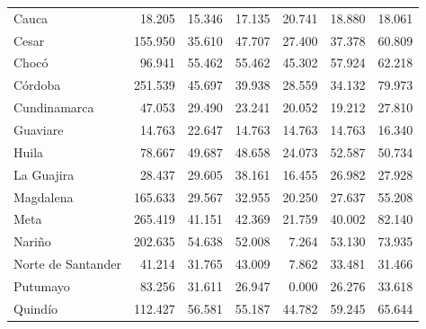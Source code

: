 \documentclass[11pt,a4paper,oneside]{article}
\begin{document}
\begin{table}
\begin{tabular}{lrrrrrr}
Cauca              & 18.205     & 15.346                             & 17.135                     & 20.741                             & 18.880 & 18.061 \\
Cesar              & 155.950    & 35.610                             & 47.707                     & 27.400                             & 37.378 & 60.809 \\
Chocó              & 96.941     & 55.462                             & 55.462                     & 45.302                             & 57.924 & 62.218 \\
Córdoba            & 251.539    & 45.697                             & 39.938                     & 28.559                             & 34.132 & 79.973 \\
Cundinamarca       & 47.053     & 29.490                             & 23.241                     & 20.052                             & 19.212 & 27.810 \\
Guaviare           & 14.763     & 22.647                             & 14.763                     & 14.763                             & 14.763 & 16.340 \\
Huila              & 78.667     & 49.687                             & 48.658                     & 24.073                             & 52.587 & 50.734 \\
La Guajira         & 28.437     & 29.605                             & 38.161                     & 16.455                             & 26.982 & 27.928 \\
Magdalena          & 165.633    & 29.567                             & 32.955                     & 20.250                             & 27.637 & 55.208 \\
Meta               & 265.419    & 41.151                             & 42.369                     & 21.759                             & 40.002 & 82.140 \\
Nariño             & 202.635    & 54.638                             & 52.008                     & 7.264                              & 53.130 & 73.935 \\
Norte de Santander & 41.214     & 31.765                             & 43.009                     & 7.862                              & 33.481 & 31.466 \\
Putumayo           & 83.256     & 31.611                             & 26.947                     & 0.000                              & 26.276 & 33.618 \\
Quindío            & 112.427    & 56.581                             & 55.187                     & 44.782                             & 59.245 & 65.644 \\

\end{tabular}
\end{table}
\end{document}
